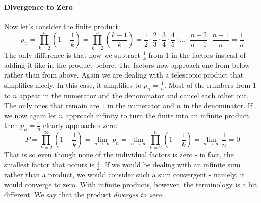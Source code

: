\paragraph{Divergence to Zero}
Now let's consider the finite product:
\begin{equation}
 p_n = \prod_{k=2}^n  \left(1 - \frac{1}{k} \right)
     = \prod_{k=2}^n  \left(\frac{k - 1}{k} \right)
     = \frac{1}{2} \cdot \frac{2}{3} \cdot \frac{3}{4} \cdot \frac{4}{5} 
       \cdot \ldots \cdot \frac{n-2}{n-1} \cdot \frac{n-1}{n}
     = \frac{1}{n}
\end{equation}
The only difference is that now we subtract $\frac{1}{k}$ from $1$ in the factors instead of adding it like in the product before. The factors now approach one from below rather than from above. Again we are dealing with a telescopic product that simplifies nicely. In this case, it simplifies to $p_n = \frac{1}{n}$. Most of the numbers from $1$ to $n$ appear in the numerator and the denominator and cancel each other out. The only ones that remain are $1$ in the numerator and $n$ in the denominator. If we now again let $n$ approach infinity to turn the finite into an infinite product, then $p_n = \frac{1}{n}$ clearly approaches zero:
\begin{equation}
 P = \prod_{k=2}^{\infty} \left(1 - \frac{1}{k} \right)
   = \lim_{n \rightarrow \infty} p_n 
   = \lim_{n \rightarrow \infty} \prod_{k=2}^n  \left(1 - \frac{1}{k} \right)
   = \lim_{n \rightarrow \infty} \frac{1}{n} 
   = 0
\end{equation}
That is so even though none of the individual factors is zero - in fact, the smallest factor that occurs is $\frac{1}{2}$. If we would be dealing with an infinite sum rather than a product, we would consider such a sum convergent - namely, it would converge to zero. With infinite products, however, the terminology is a bit different. We say that the product \emph{diverges to zero}. 





